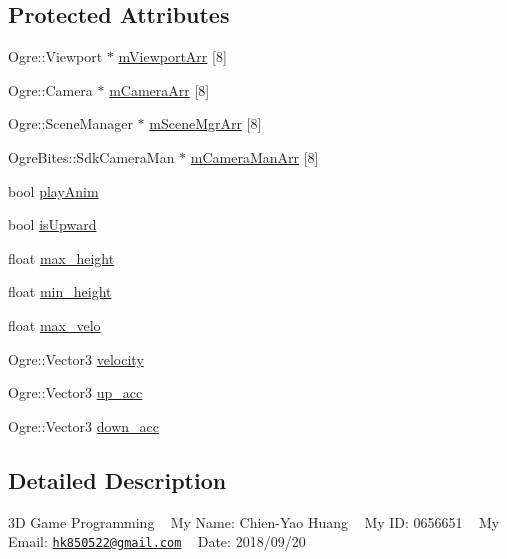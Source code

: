 \subsection*{Protected Attributes}
\begin{DoxyCompactItemize}
\item 
Ogre\+::\+Viewport $\ast$ \mbox{\hyperlink{class_basic_tutorial__00_a6676a92b50e9b43634d4c66488537b73}{m\+Viewport\+Arr}} \mbox{[}8\mbox{]}
\item 
Ogre\+::\+Camera $\ast$ \mbox{\hyperlink{class_basic_tutorial__00_af8d457d912286a98c0975c52d4faf910}{m\+Camera\+Arr}} \mbox{[}8\mbox{]}
\item 
Ogre\+::\+Scene\+Manager $\ast$ \mbox{\hyperlink{class_basic_tutorial__00_a603779b6087698c57b7989e16d8a9b93}{m\+Scene\+Mgr\+Arr}} \mbox{[}8\mbox{]}
\item 
Ogre\+Bites\+::\+Sdk\+Camera\+Man $\ast$ \mbox{\hyperlink{class_basic_tutorial__00_a700c07f924c71e9fa1885a46f599d934}{m\+Camera\+Man\+Arr}} \mbox{[}8\mbox{]}
\item 
bool \mbox{\hyperlink{class_basic_tutorial__00_a0d974de1a6955553775aa06d1df374be}{play\+Anim}}
\item 
bool \mbox{\hyperlink{class_basic_tutorial__00_a26b2c1e7db607fefcfeb65073d3db8ee}{is\+Upward}}
\item 
float \mbox{\hyperlink{class_basic_tutorial__00_a54237e9e69a120912349ee2cadbd3e16}{max\+\_\+height}}
\item 
float \mbox{\hyperlink{class_basic_tutorial__00_a48bd1d1a7035b7edbb90297e2d9f28ec}{min\+\_\+height}}
\item 
float \mbox{\hyperlink{class_basic_tutorial__00_a2448b63a5e8152ac4e6826d7bbf249ca}{max\+\_\+velo}}
\item 
Ogre\+::\+Vector3 \mbox{\hyperlink{class_basic_tutorial__00_a9146709112187aa671a6a6dbe3282556}{velocity}}
\item 
Ogre\+::\+Vector3 \mbox{\hyperlink{class_basic_tutorial__00_ab13a24b7ff14b1cf4da3dbf16bcd0f01}{up\+\_\+acc}}
\item 
Ogre\+::\+Vector3 \mbox{\hyperlink{class_basic_tutorial__00_ac6e8f5f86ae244acb97980b4c31fe370}{down\+\_\+acc}}
\end{DoxyCompactItemize}


\subsection{Detailed Description}
3D Game Programming ~\newline
My Name\+: Chien-\/\+Yao Huang ~\newline
My ID\+: 0656651 ~\newline
My Email\+: \href{mailto:hk850522@gmail.com}{\tt hk850522@gmail.\+com} ~\newline
 Date\+: 2018/09/20 

